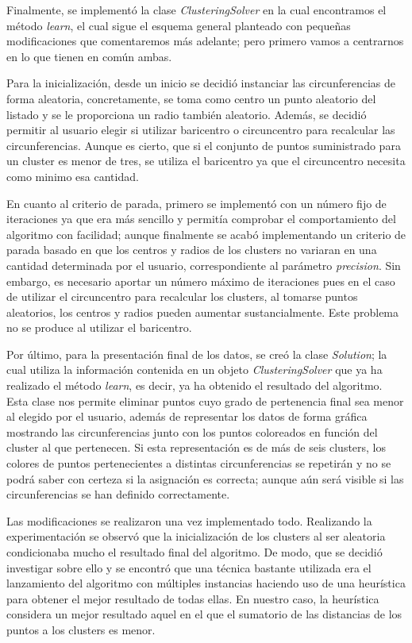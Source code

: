 \documentclass[conference,a4paper]{IEEEtran}
\begin{document}
Finalmente, se implementó la clase \textit{ClusteringSolver} en la cual encontramos el método \textit{learn}, el cual sigue el esquema general planteado con pequeñas modificaciones que comentaremos más adelante; pero primero vamos a centrarnos en lo que tienen en común ambas.

Para la inicialización, desde un inicio se decidió instanciar las circunferencias de forma aleatoria, concretamente, se toma como centro un punto aleatorio del listado y se le proporciona un radio también aleatorio. Además, se decidió permitir al usuario elegir si utilizar baricentro o circuncentro para recalcular las circunferencias. Aunque es cierto, que si el conjunto de puntos suministrado para un cluster es menor de tres, se utiliza el baricentro ya que el circuncentro necesita como minimo esa cantidad.

En cuanto al criterio de parada, primero se implementó con un número fijo de iteraciones ya que era más sencillo y permitía comprobar el comportamiento del algoritmo con facilidad; aunque finalmente se acabó implementando un criterio de parada basado en que los centros y radios de los clusters no variaran en una cantidad determinada por el usuario, correspondiente al parámetro \textit{precision}. Sin embargo, es necesario aportar un número máximo de iteraciones pues en el caso de utilizar el circuncentro para recalcular los clusters, al tomarse puntos aleatorios, los centros y radios pueden aumentar sustancialmente. Este problema no se produce al utilizar el baricentro.

Por último, para la presentación final de los datos, se creó la clase  \textit{Solution}; la cual utiliza la información contenida en un objeto \textit{ClusteringSolver} que ya ha realizado el método  \textit{learn}, es decir, ya ha obtenido el resultado del algoritmo. Esta clase nos permite eliminar puntos cuyo grado de pertenencia final sea menor al elegido por el usuario, además de representar los datos de forma gráfica mostrando las circunferencias junto con los puntos coloreados en función del cluster al que pertenecen. Si esta representación es de más de seis clusters,  los colores de puntos pertenecientes a distintas circunferencias se repetirán y no se podrá saber con certeza si la asignación es correcta; aunque aún será visible si las circunferencias se han definido correctamente.

Las modificaciones se realizaron una vez implementado todo. Realizando la experimentación se observó que la inicialización de los clusters al ser aleatoria condicionaba mucho el resultado final del algoritmo. De modo, que se decidió investigar sobre ello y se encontró que una técnica bastante utilizada era el lanzamiento del algoritmo con múltiples instancias haciendo uso de una heurística para obtener el mejor resultado de todas ellas. En nuestro caso, la heurística  considera un mejor resultado aquel en el que el sumatorio de las distancias de los puntos a los clusters es menor.
\end{document}
